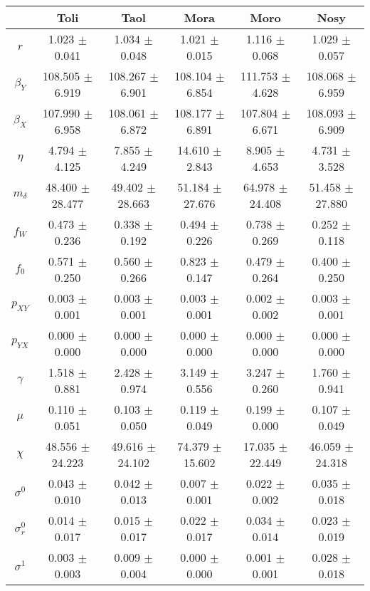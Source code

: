 \begin{sidewaystable}
\centering
\begin{tabular}{cccccc}
 & {\bf Toli} & {\bf Taol} & {\bf Mora} & {\bf Moro} & {\bf Nosy} \\
\hline\hline
{\bf $r$} & 1.023 $\pm$ 0.041 & 1.034 $\pm$ 0.048 & 1.021 $\pm$ 0.015 & 1.116 $\pm$ 0.068 & 1.029 $\pm$ 0.057 \\
{\bf $\beta_Y$} & 108.505 $\pm$ 6.919 & 108.267 $\pm$ 6.901 & 108.104 $\pm$ 6.854 & 111.753 $\pm$ 4.628 & 108.068 $\pm$ 6.959 \\
{\bf $\beta_X$} & 107.990 $\pm$ 6.958 & 108.061 $\pm$ 6.872 & 108.177 $\pm$ 6.891 & 107.804 $\pm$ 6.671 & 108.093 $\pm$ 6.909 \\
{\bf $\eta$} & 4.794 $\pm$ 4.125 & 7.855 $\pm$ 4.249 & 14.610 $\pm$ 2.843 & 8.905 $\pm$ 4.653 & 4.731 $\pm$ 3.528 \\
{\bf $m_{\delta}$} & 48.400 $\pm$ 28.477 & 49.402 $\pm$ 28.663 & 51.184 $\pm$ 27.676 & 64.978 $\pm$ 24.408 & 51.458 $\pm$ 27.880 \\
{\bf $f_W$} & 0.473 $\pm$ 0.236 & 0.338 $\pm$ 0.192 & 0.494 $\pm$ 0.226 & 0.738 $\pm$ 0.269 & 0.252 $\pm$ 0.118 \\
{\bf $f_0$} & 0.571 $\pm$ 0.250 & 0.560 $\pm$ 0.266 & 0.823 $\pm$ 0.147 & 0.479 $\pm$ 0.264 & 0.400 $\pm$ 0.250 \\
{\bf $p_{XY}$} & 0.003 $\pm$ 0.001 & 0.003 $\pm$ 0.001 & 0.003 $\pm$ 0.001 & 0.002 $\pm$ 0.002 & 0.003 $\pm$ 0.001 \\
{\bf $p_{YX}$} & 0.000 $\pm$ 0.000 & 0.000 $\pm$ 0.000 & 0.000 $\pm$ 0.000 & 0.000 $\pm$ 0.000 & 0.000 $\pm$ 0.000 \\
{\bf $\gamma$} & 1.518 $\pm$ 0.881 & 2.428 $\pm$ 0.974 & 3.149 $\pm$ 0.556 & 3.247 $\pm$ 0.260 & 1.760 $\pm$ 0.941 \\
{\bf $\mu$} & 0.110 $\pm$ 0.051 & 0.103 $\pm$ 0.050 & 0.119 $\pm$ 0.049 & 0.199 $\pm$ 0.000 & 0.107 $\pm$ 0.049 \\
{\bf $\chi$} & 48.556 $\pm$ 24.223 & 49.616 $\pm$ 24.102 & 74.379 $\pm$ 15.602 & 17.035 $\pm$ 22.449 & 46.059 $\pm$ 24.318 \\
{\bf $\sigma^0$} & 0.043 $\pm$ 0.010 & 0.042 $\pm$ 0.013 & 0.007 $\pm$ 0.001 & 0.022 $\pm$ 0.002 & 0.035 $\pm$ 0.018 \\
{\bf $\sigma^0_r$} & 0.014 $\pm$ 0.017 & 0.015 $\pm$ 0.017 & 0.022 $\pm$ 0.017 & 0.034 $\pm$ 0.014 & 0.023 $\pm$ 0.019 \\
{\bf $\sigma^1$} & 0.003 $\pm$ 0.003 & 0.009 $\pm$ 0.004 & 0.000 $\pm$ 0.000 & 0.001 $\pm$ 0.001 & 0.028 $\pm$ 0.018 \\

\end{tabular}
\end{sidewaystable}
